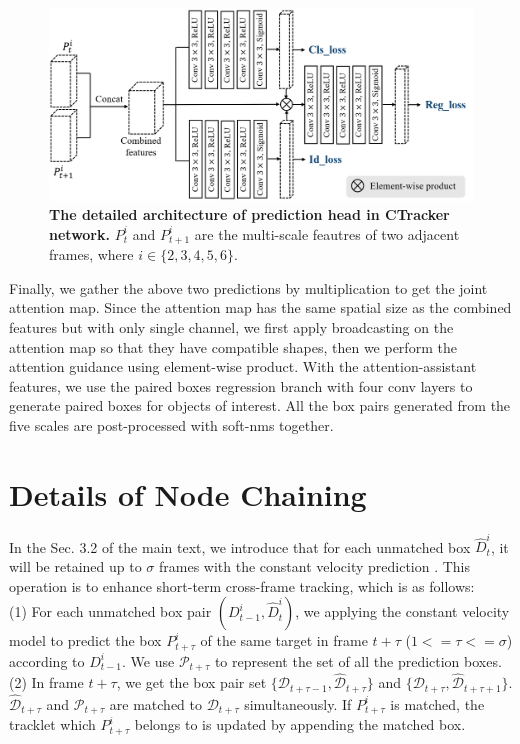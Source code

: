 \documentclass[crop=false]{standalone}
\begin{document}
\begin{figure}[ht]
\centering{}\includegraphics[width=0.90\columnwidth]{figure/figure1.png}
\vspace{-3mm}
\caption{\label{fig:head}\textbf{The detailed architecture of prediction head in CTracker network.} $P_t^i$ and $P_{t+1}^i$ are the multi-scale feautres of two adjacent frames, where $i \in \{2,3,4,5,6\}$.}
\vspace{-3mm}
\end{figure}

Finally, we gather the above two predictions by multiplication to get the joint attention map. Since the attention map has the same spatial size as the combined features but with only single channel, we first apply broadcasting on the attention map so that they have compatible shapes, then we perform the attention guidance using element-wise product. With the attention-assistant features, we use the paired boxes regression branch with four conv layers to generate paired boxes for objects of interest. All the box pairs generated from the five scales are post-processed with soft-nms \cite{softnms} together. 

\iffalse

\section{Details of Node Chaining\label{section:s_chaining}}

In the Sec. 3.2 of the main text, we introduce that for each unmatched box ${\hat{D}_{t}^{i}}$, it will be retained up to $\sigma$ frames with the constant velocity prediction \cite{wojke2017simple}. This operation is to enhance short-term cross-frame tracking, which is as follows:\\
(1) For each unmatched box pair $(D_{t-1}^{i},\hat{D}_{t}^{i})$, we applying the constant velocity model to predict the box $P_{t+\tau}^{i}$ of the same target in frame $t+\tau$ ($1 <= \tau <= \sigma$) according to $D_{t-1}^{i}$. We use $\mathcal{P}_{t+\tau}$ to represent the set of all the prediction boxes.\\
(2) In frame $t+\tau$, we get the box pair set $\{\mathcal{D}_{t+\tau-1},{\mathcal{\hat{D}}_{t+\tau}}\}$ and $\{\mathcal{D}_{t+\tau},{\mathcal{\hat{D}}_{t+\tau+1}}\}$. $\mathcal{\hat{D}}_{t+\tau}$ and $\mathcal{P}_{t+\tau}$ are matched to $\mathcal{D}_{t+\tau}$ simultaneously. If $P_{t+\tau}^{i}$ is matched, the tracklet which $P_{t+\tau}^{i}$ belongs to is updated by appending the matched box.
\end{document}
